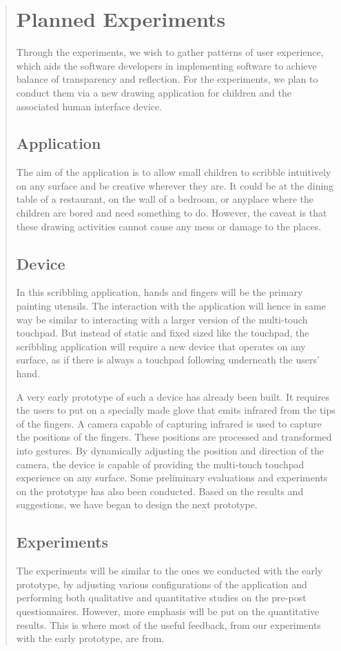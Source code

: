 \documentclass[a4paper,titlepage]{article}
\begin{document}
\begin{quote}
\section{Planned Experiments}
\label{sec:experiment}
Through the experiments, we wish to gather patterns of user
experience, which aids the software developers in implementing
software to achieve balance of transparency and reflection. For the
experiments, we plan to conduct them via a new drawing application for
children and the associated human interface device.

\subsection{Application}
The aim of the application is to allow small children to scribble
intuitively on any surface and be creative wherever they are. It could
be at the dining table of a restaurant, on the wall of a bedroom, or
anyplace where the children are bored and need something to
do. However, the caveat is that these drawing activities cannot cause
any mess or damage to the places.

\subsection{Device}
In this scribbling application, hands and fingers will be the primary
painting utensils. The interaction with the application will hence in
same way be similar to interacting with a larger version of the
multi-touch touchpad. But instead of static and fixed sized like the
touchpad, the scribbling application will require a new device that
operates on any surface, as if there is always a touchpad following
underneath the users' hand.

A very early prototype of such a device has already been built. It
requires the users to put on a specially made glove that emits
infrared from the tips of the fingers. A camera capable of capturing
infrared is used to capture the positions of the fingers. These
positions are processed and transformed into gestures. By dynamically
adjusting the position and direction of the camera, the device is
capable of providing the multi-touch touchpad experience on any
surface. Some preliminary evaluations and experiments on the prototype
has also been conducted.  Based on the results and suggestions, we
have began to design the next prototype.

\subsection{Experiments}
The experiments will be similar to the ones we conducted with the
early prototype, by adjusting various configurations of the
application and performing both qualitative and quantitative studies
on the pre-post questionnaires. However, more emphasis will be put on
the quantitative results. This is where most of the useful feedback,
from our experiments with the early prototype, are from.


\end{quote}
\end{document}
